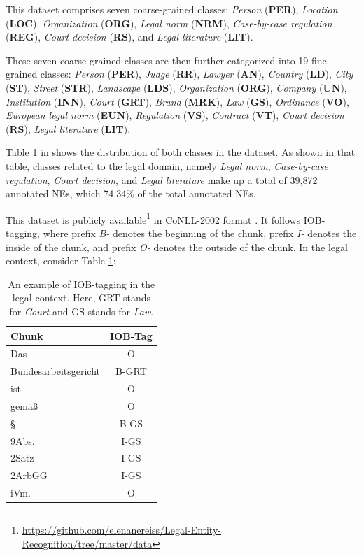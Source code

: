 \documentclass[a4paper,twoside]{article}
\begin{document}
This dataset comprises seven coarse-grained classes: \textit{Person} (\textbf{PER}), \textit{Location} (\textbf{LOC}), \textit{Organization} (\textbf{ORG}), \textit{Legal norm} (\textbf{NRM}), \textit{Case-by-case regulation} (\textbf{REG}), \textit{Court decision} (\textbf{RS}), and \textit{Legal literature} (\textbf{LIT}).

These seven coarse-grained classes are then further categorized into 19 fine-grained classes: \textit{Person} (\textbf{PER}), \textit{Judge} (\textbf{RR}), \textit{Lawyer} (\textbf{AN}), \textit{Country} (\textbf{LD}), \textit{City} (\textbf{ST}), \textit{Street} (\textbf{STR}), \textit{Landscape} (\textbf{LDS}), \textit{Organization} (\textbf{ORG}), \textit{Company} (\textbf{UN}), \textit{Institution} (\textbf{INN}), \textit{Court} (\textbf{GRT}), \textit{Brand} (\textbf{MRK}), \textit{Law} (\textbf{GS}), \textit{Ordinance} (\textbf{VO}), \textit{European legal norm} (\textbf{EUN}), \textit{Regulation} (\textbf{VS}), \textit{Contract} (\textbf{VT}), \textit{Court decision} (\textbf{RS}), \textit{Legal literature} (\textbf{LIT}).

Table 1 in \cite{leitner2020dataset} shows the distribution of both classes in the dataset. As shown in that table, classes related to the legal domain, namely \textit{Legal norm}, \textit{Case-by-case regulation}, \textit{Court decision}, and \textit{Legal literature} make up a total of 39,872 annotated NEs, which 74.34\% of the total annotated NEs.

This dataset is publicly available\footnote{\url{https://github.com/elenanereiss/Legal-Entity-Recognition/tree/master/data}} in CoNLL-2002 format \cite{sang2003introduction}. It follows IOB-tagging, where prefix \textit{B-} denotes the beginning of the chunk, prefix \textit{I-} denotes the inside of the chunk, and prefix \textit{O-} denotes the outside of the chunk. In the legal context, consider Table \ref{tab:example}:

\begin{table}[h]
\centering
\begin{tabular}{lc}
\hline
\textbf{Chunk} & \textbf{IOB-Tag}\\
\hline
Das & O \\
Bundesarbeitsgericht & B-GRT \\
ist & O \\
gemäß & O \\
§ & B-GS \\
9Abs. & I-GS \\
2Satz & I-GS \\
2ArbGG & I-GS \\
iVm. & O \\
\hline
\end{tabular}
\caption{An example of IOB-tagging in the legal context. Here, GRT stands for \textit{Court} and GS stands for \textit{Law}.}
\label{tab:example}
\end{table}
\end{document}
